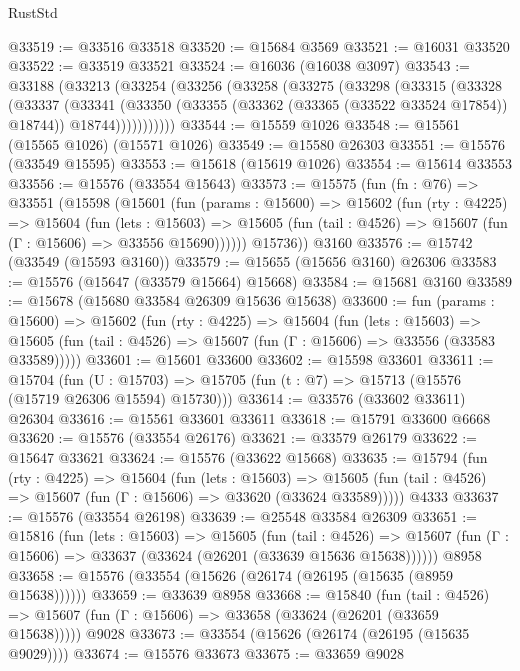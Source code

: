 \begin{lexlean}{RustStd}
\begin{coremodule}
@33519 := @33516 @33518
@33520 := @15684 @3569
@33521 := @16031 @33520
@33522 := @33519 @33521
@33524 := @16036 (@16038 @3097)
@33543 := @33188
    (@33213
      (@33254
        (@33256
          (@33258
            (@33275
              (@33298
                (@33315
                  (@33328
                    (@33337
                      (@33341
                        (@33350
                          (@33355 (@33362 (@33365 (@33522 @33524 @17854)) @18744))
                          @18744)))))))))))
@33544 := @15559 @1026
@33548 := @15561 (@15565 @1026) (@15571 @1026)
@33549 := @15580 @26303
@33551 := @15576 (@33549 @15595)
@33553 := @15618 (@15619 @1026)
@33554 := @15614 @33553
@33556 := @15576 (@33554 @15643)
@33573 := @15575
    (fun (fn : @76) =>
    @33551
      (@15598
        (@15601
          (fun (params : @15600) =>
          @15602
            (fun (rty : @4225) =>
            @15604
              (fun (lets : @15603) =>
              @15605 (fun (tail : @4526) => @15607 (fun (Γ : @15606) => @33556 @15690))))))
        @15736))
    @3160
@33576 := @15742 (@33549 (@15593 @3160))
@33579 := @15655 (@15656 @3160) @26306
@33583 := @15576 (@15647 (@33579 @15664) @15668)
@33584 := @15681 @3160
@33589 := @15678 (@15680 @33584 @26309 @15636 @15638)
@33600 := fun (params : @15600) =>
  @15602
    (fun (rty : @4225) =>
    @15604
      (fun (lets : @15603) =>
      @15605 (fun (tail : @4526) => @15607 (fun (Γ : @15606) => @33556 (@33583 @33589)))))
@33601 := @15601 @33600
@33602 := @15598 @33601
@33611 := @15704
    (fun (U : @15703) => @15705 (fun (t : @7) => @15713 (@15576 (@15719 @26306 @15594) @15730)))
@33614 := @33576 (@33602 @33611) @26304
@33616 := @15561 @33601 @33611
@33618 := @15791 @33600 @6668
@33620 := @15576 (@33554 @26176)
@33621 := @33579 @26179
@33622 := @15647 @33621
@33624 := @15576 (@33622 @15668)
@33635 := @15794
    (fun (rty : @4225) =>
    @15604
      (fun (lets : @15603) =>
      @15605 (fun (tail : @4526) => @15607 (fun (Γ : @15606) => @33620 (@33624 @33589)))))
    @4333
@33637 := @15576 (@33554 @26198)
@33639 := @25548 @33584 @26309
@33651 := @15816
    (fun (lets : @15603) =>
    @15605
      (fun (tail : @4526) =>
      @15607 (fun (Γ : @15606) => @33637 (@33624 (@26201 (@33639 @15636 @15638))))))
    @8958
@33658 := @15576 (@33554 (@15626 (@26174 (@26195 (@15635 (@8959 @15638))))))
@33659 := @33639 @8958
@33668 := @15840
    (fun (tail : @4526) => @15607 (fun (Γ : @15606) => @33658 (@33624 (@26201 (@33659 @15638)))))
    @9028
@33673 := @33554 (@15626 (@26174 (@26195 (@15635 @9029))))
@33674 := @15576 @33673
@33675 := @33659 @9028

\end{coremodule}
\end{lexlean}
